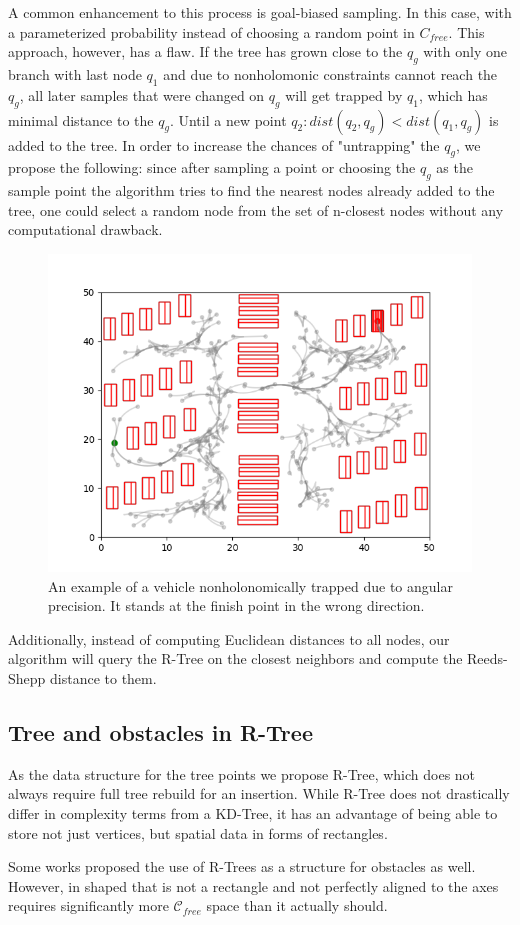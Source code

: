 \documentclass[12pt]{article}
\DeclareRobustCommand{\[}{\begin{equation}}
\DeclareRobustCommand{\]}{\end{equation}}
\numberwithin{equation}{section}
\begin{document}
A common enhancement to this process is goal-biased sampling. In this case, with a parameterized probability instead of choosing a random point in $C_{free}$. This approach, however,
has a flaw. If the tree has grown close to the $q_g$ with only one branch with last node $q_1$ and due to nonholomonic constraints cannot reach the $q_g$, all later samples that
were changed on $q_g$ will get trapped by $q_1$, which has minimal distance to the $q_g$. Until a new point $q_2: dist(q_2, q_g) < dist(q_1, q_g)$ is added to the tree.
In order to increase the chances of "untrapping" the $q_g$, we propose the following: since after sampling a point or choosing the $q_g$ as the sample point the algorithm tries to 
find the nearest nodes already added to the tree, one could select a random node from the set of n-closest nodes without any computational drawback. 

\begin{figure}
\begin{center}
\includegraphics[scale=0.7]{images/car_trapped.png}
\captionsetup{width=0.6\textwidth}
\caption{An example of a vehicle nonholonomically trapped due to angular precision. It stands at the finish point in the wrong direction.}
\end{center}
\end{figure}

Additionally, instead of computing Euclidean distances to all nodes, our algorithm will query the R-Tree on the closest neighbors and compute the Reeds-Shepp distance to them. 

\subsection{Tree and obstacles in R-Tree}

As the data structure for the tree points we propose R-Tree, which does not always require full tree rebuild for an insertion.
While R-Tree does not drastically differ in complexity terms from a KD-Tree, it has an advantage of being able to store not just vertices,
but spatial data in forms of rectangles.

Some works proposed the use of R-Trees as a structure for obstacles as well. However, in shaped that is not a rectangle and not perfectly aligned to the axes requires significantly
more $\mathcal{C}_{free}$ space than it actually should.
\end{document}
